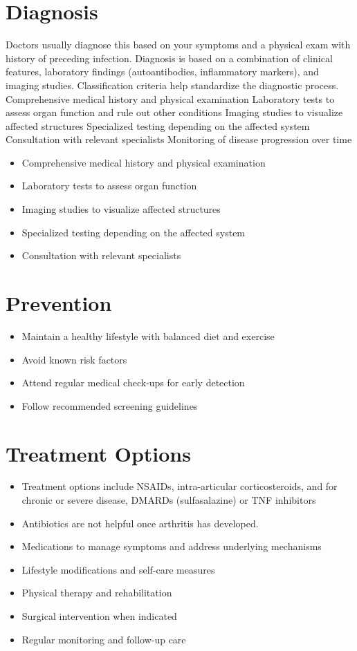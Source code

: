 \section{Diagnosis}
Doctors usually diagnose this based on your symptoms and a physical exam with history of preceding infection. Diagnosis is based on a combination of clinical features, laboratory findings (autoantibodies, inflammatory markers), and imaging studies. Classification criteria help standardize the diagnostic process. Comprehensive medical history and physical examination Laboratory tests to assess organ function and rule out other conditions Imaging studies to visualize affected structures Specialized testing depending on the affected system Consultation with relevant specialists Monitoring of disease progression over time

\begin{itemize}[noitemsep]
  \item Comprehensive medical history and physical examination
  \item Laboratory tests to assess organ function
  \item Imaging studies to visualize affected structures
  \item Specialized testing depending on the affected system
  \item Consultation with relevant specialists
\end{itemize}
\section{Prevention}
\begin{itemize}[noitemsep]
  \item Maintain a healthy lifestyle with balanced diet and exercise
  \item Avoid known risk factors
  \item Attend regular medical check-ups for early detection
  \item Follow recommended screening guidelines
\end{itemize}
\section{Treatment Options}
\begin{itemize}[noitemsep]
  \item Treatment options include NSAIDs, intra-articular corticosteroids, and for chronic or severe disease, DMARDs (sulfasalazine) or TNF inhibitors
  \item Antibiotics are not helpful once arthritis has developed.
  \item Medications to manage symptoms and address underlying mechanisms
  \item Lifestyle modifications and self-care measures
  \item Physical therapy and rehabilitation
  \item Surgical intervention when indicated
  \item Regular monitoring and follow-up care
\end{itemize}
